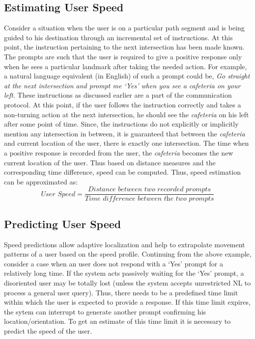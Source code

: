 \documentclass{iitkthesis}
\begin{document}
\subsection{Estimating User Speed}
Consider a situation when the user is on a particular path segment and 
is being guided to his destination through an incremental set of 
instructions. At this point, the instruction pertaining to the next 
intersection has been made known. The prompts are such that the user is 
required to give a positive response only when he sees a particular 
landmark after taking the needed action. For example, a natural language 
equivalent (in English) of such a prompt could be, \textit{Go straight at 
the next intersection and prompt me `Yes' when you see a cafeteria on 
your left}. These instructions as discussed earlier are a part of the 
communication protocol. At this point, if the user follows the 
instruction correctly and takes a non-turning action at the next 
intersection, he should see the \textit{cafeteria} on his left after some 
point of time. Since, the instructions do not explicitly or implicitly 
mention any intersection in between, it is guaranteed that between 
the \textit{cafeteria} and current location of the user, there is exactly 
one intersection. The time when a positive response is recorded from the 
user, the \textit{cafeteria} becomes the new current location of the user.
Thus based on distance measures and the corresponding time difference, 
speed can be computed. Thus, speed estimation can be approximated  as:
\[\displaystyle \textit{User Speed}=\frac{\textit{Distance between two recorded prompts}}{\textit{Time difference between the two prompts}}\]
\subsection{Predicting User Speed}
\label{sect:predictspeed}
Speed predictions allow adaptive localization 
and help to extrapolate movement patterns of a user based on the speed 
profile. Continuing from the above example, consider a case when an user 
does not respond with a `Yes' prompt for a relatively long time. If the 
system acts passively waiting for the `Yes' prompt, a disoriented user 
may be totally lost (unless the system accepts unrestricted NL to process 
a general user query). Thus, there needs to be a predefined time limit within 
which the user is expected to provide a response. If this time limit 
expires, the sytem can interrupt to generate another prompt confirming 
his location/orientation. To get an estimate of this time limit it is 
necessary to predict the speed of the user. 
\end{document}
